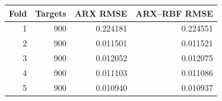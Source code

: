 \begin{tabular}{rrrr}\toprule
Fold & Targets & ARX RMSE & ARX--RBF RMSE\\\midrule
1 & 900 & 0.224181 & 0.224551\\
2 & 900 & 0.011501 & 0.011521\\
3 & 900 & 0.012052 & 0.012075\\
4 & 900 & 0.011103 & 0.011086\\
5 & 900 & 0.010940 & 0.010937\\
\bottomrule
\end{tabular}
